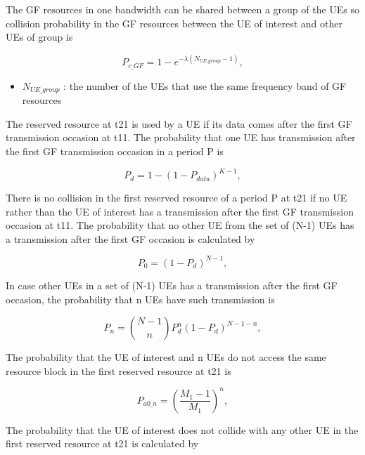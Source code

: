 \documentclass[conference]{IEEEtran}
\begin{document}
The GF resources in one bandwidth can be shared between a group of the UEs so collision probability in the GF resources between the UE of interest and other UEs of group is

\begin{equation}
P_{c\_GF} = 1 - e^{-\lambda(N_{UE\_group}-1)},\label{eq2}
\end{equation}
\begin{itemize}
    \item $N_{UE\_group}$ : the number of the UEs that use the same frequency band of GF resources
\end{itemize}

The reserved resource at t21 is used by a UE if its data comes after the first GF transmission occasion at t11. The probability that one UE has transmission after the first GF transmission occasion in a period P is

\begin{equation}
P_{d} = 1 - (1-P_{data})^{K-1},\label{eq3}
\end{equation}

There is no collision in the first reserved resource of a period P at t21 if no UE rather than the UE of interest has a transmission after the first GF transmission occasion at t11. The probability that no other UE from the set of (N-1) UEs has a transmission after the first GF occasion is calculated by

\begin{equation}
P_{0} = (1-P_{d})^{N-1},\label{eq4}
\end{equation}

In case other UEs in a set of (N-1) UEs has a transmission after the first GF occasion, the probability that n UEs have such transmission is

\begin{equation}
P_{n} = \binom {N-1}{n}P_{d}^{n}(1-P_{d})^{N-1-n},\label{eq5}
\end{equation}

The probability that the UE of interest and n UEs do not access the same resource block in the first reserved resource at t21 is

\begin{equation}
P_{a0\_n} = (\frac {M_{1}-1}{M_{1}})^{n},\label{eq6}
\end{equation}

The probability that the UE of interest does not collide with any other UE in the first reserved resource at t21 is calculated by
\end{document}
